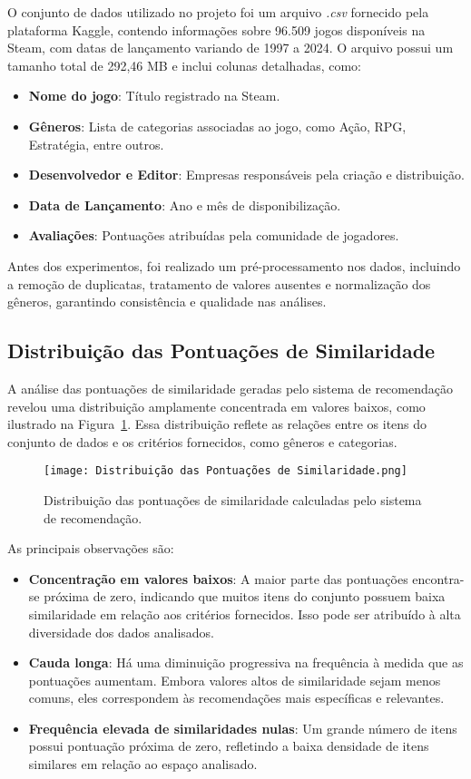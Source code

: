 \documentclass[conference]{IEEEtran}
\begin{document}
O conjunto de dados utilizado no projeto foi um arquivo \textit{.csv} fornecido pela plataforma Kaggle, contendo informações sobre 96.509 jogos disponíveis na Steam, com datas de lançamento variando de 1997 a 2024. O arquivo possui um tamanho total de 292,46 MB e inclui colunas detalhadas, como:
\begin{itemize}
    \item \textbf{Nome do jogo}: Título registrado na Steam.
    \item \textbf{Gêneros}: Lista de categorias associadas ao jogo, como Ação, RPG, Estratégia, entre outros.
    \item \textbf{Desenvolvedor e Editor}: Empresas responsáveis pela criação e distribuição.
    \item \textbf{Data de Lançamento}: Ano e mês de disponibilização.
    \item \textbf{Avaliações}: Pontuações atribuídas pela comunidade de jogadores.
\end{itemize}

Antes dos experimentos, foi realizado um pré-processamento nos dados, incluindo a remoção de duplicatas, tratamento de valores ausentes e normalização dos gêneros, garantindo consistência e qualidade nas análises.

\subsection{Distribuição das Pontuações de Similaridade}

A análise das pontuações de similaridade geradas pelo sistema de recomendação revelou uma distribuição amplamente concentrada em valores baixos, como ilustrado na Figura~\ref{fig:similarity_distribution}. Essa distribuição reflete as relações entre os itens do conjunto de dados e os critérios fornecidos, como gêneros e categorias.

\begin{figure}[h!] \centering \texttt{[image: Distribuição das Pontuações de Similaridade.png]} \caption{Distribuição das pontuações de similaridade calculadas pelo sistema de recomendação.} \label{fig:similarity_distribution} \end{figure}

As principais observações são: \begin{itemize} \item \textbf{Concentração em valores baixos}: A maior parte das pontuações encontra-se próxima de zero, indicando que muitos itens do conjunto possuem baixa similaridade em relação aos critérios fornecidos. Isso pode ser atribuído à alta diversidade dos dados analisados. \item \textbf{Cauda longa}: Há uma diminuição progressiva na frequência à medida que as pontuações aumentam. Embora valores altos de similaridade sejam menos comuns, eles correspondem às recomendações mais específicas e relevantes. \item \textbf{Frequência elevada de similaridades nulas}: Um grande número de itens possui pontuação próxima de zero, refletindo a baixa densidade de itens similares em relação ao espaço analisado. \end{itemize}
\end{document}
